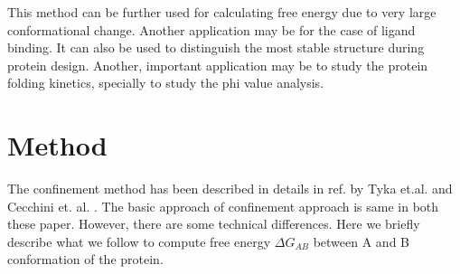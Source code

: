 \documentclass[12pt]{article}
\begin{document}
This method can be further used for calculating free energy due to very large conformational change. Another application may be
for the case of ligand binding. It can also be used to distinguish the most stable structure during protein design. Another, important
application may be to study the protein folding kinetics, specially to study the phi value analysis.            


\section{Method}

The confinement method has been described in details in ref. by Tyka et.al. \cite{Tyka2006} and 
Cecchini et. al. \cite{Cecchini2009}. The basic approach of confinement approach is same in both
these paper. However, there are some technical differences. Here we briefly describe what we follow
to compute free energy $\Delta G_{AB}$ between A and B
conformation of the protein.
\end{document}
